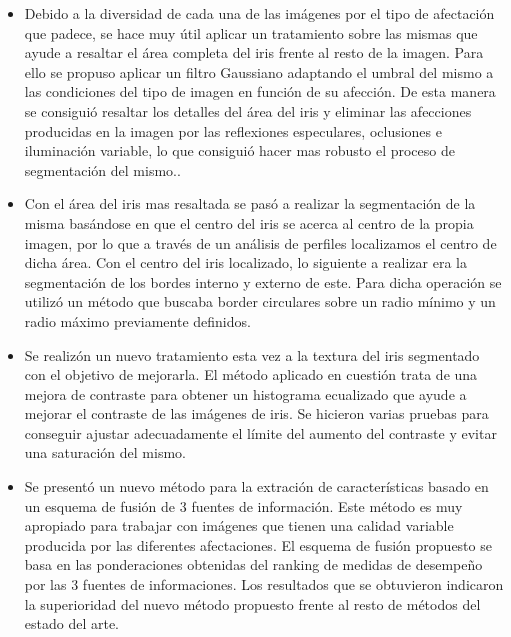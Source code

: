 \begin{itemize}
    \item Debido a la diversidad de cada una de las imágenes por el tipo de afectación que padece, se hace muy útil aplicar un tratamiento sobre las mismas que ayude a resaltar el área completa del iris frente al resto de la imagen. Para ello se propuso aplicar un filtro Gaussiano adaptando el umbral del mismo a las condiciones del tipo de imagen en función de su afección. De esta manera se consiguió resaltar los detalles del área del iris y eliminar las afecciones producidas en la imagen por las reflexiones especulares, oclusiones e iluminación variable, lo que consiguió hacer mas robusto el proceso de segmentación del mismo..\\
    
    \item Con el área del iris mas resaltada se pasó a realizar la segmentación de la misma basándose en que el centro del iris se acerca al centro de la propia imagen, por lo que a través de un análisis de perfiles localizamos el centro de dicha área. Con el centro del iris localizado, lo siguiente a realizar era la segmentación de los bordes interno y externo de este. Para dicha operación se utilizó un método que buscaba border circulares sobre un radio mínimo y un radio máximo previamente definidos.\\
    
    \item Se realizón un nuevo tratamiento esta vez a la textura del iris segmentado con el objetivo de mejorarla. El método aplicado en cuestión trata de una mejora de contraste para obtener un histograma ecualizado que ayude a mejorar el contraste de las imágenes de iris. Se hicieron varias pruebas para conseguir ajustar adecuadamente el límite del aumento del contraste y evitar una saturación del mismo. \\
    
    \item Se presentó un nuevo método para la extración de características basado en un esquema de fusión de 3 fuentes de información. Este método es muy apropiado para trabajar con imágenes que tienen una calidad variable producida por las diferentes afectaciones. El esquema de fusión propuesto se basa en las ponderaciones obtenidas  del ranking de medidas de desempeño por las 3 fuentes de informaciones. Los resultados que se obtuvieron indicaron la superioridad del nuevo método propuesto frente al resto de métodos del estado del arte. \\
\end{itemize} 


